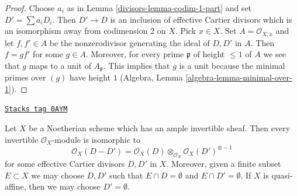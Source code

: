\begin{proof}

Choose $a_i$ as in Lemma \ref{divisors-lemma-codim-1-part} and set $D' = \sum a_i D_i$.
Then $D' \to D$ is an inclusion of effective Cartier divisors which
is an isomorphism away from codimension $2$ on $X$. Pick $x \in X$.
Set $A = \mathcal{O}_{X, x}$ and let $f, f' \in A$ be the nonzerodivisor
generating the ideal of $D, D'$ in $A$. Then $f = gf'$ for some $g \in A$.
Moreover, for every prime $\mathfrak p$ of height $\leq 1$ of $A$ we see
that $g$ maps to a unit of $A_\mathfrak p$. This implies that $g$ is
a unit because the minimal primes over $(g)$ have height $1$
(Algebra, Lemma \ref{algebra-lemma-minimal-over-1}).
\end{proof}

\begin{lemma}
\label{divisors-lemma-quasi-projective-Noetherian-pic-effective-Cartier}
\href{https://stacks.math.columbia.edu/tag/0AYM}{\texttt{Stacks tag 0AYM}}


Let $X$ be a Noetherian scheme which has an ample invertible sheaf.
Then every invertible $\mathcal{O}_X$-module is isomorphic to
$$
\mathcal{O}_X(D - D') =
\mathcal{O}_X(D) \otimes_{\mathcal{O}_X} \mathcal{O}_X(D')^{\otimes -1}
$$
for some effective Cartier divisors $D, D'$ in $X$. Moreover, given a
finite subset $E \subset X$ we may choose $D, D'$ such that
$E \cap D = \emptyset$ and $E \cap D' = \emptyset$. If
$X$ is quasi-affine, then we may choose $D' = \emptyset$.
\end{lemma}

